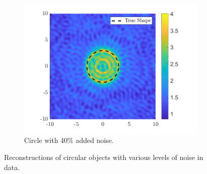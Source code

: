 \documentclass[]{article}
\begin{document}
\begin{figure}[h]
\begin{subfigure}{.3\textwidth}
					\centering
					\includegraphics[width = \textwidth]{Numeric Simulations/Images/circle-40-noise-reconstructed}
					\caption{Circle with 40\% added noise.}
				\end{subfigure}
				\caption{Reconstructions of circular objects with various levels of noise in data.}
				\label{fig:circlenoise}
			\end{figure} 
\end{document}
